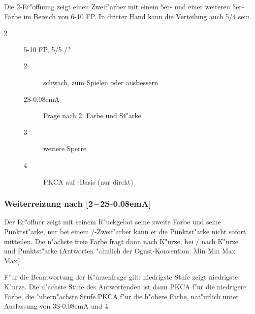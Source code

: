 \documentclass[11pt,german,twocolumn,twoside]{scrartcl}
\def\co{\He\xspace}
\def\tr{\Cl\xspace}
\def\sa{\nobreak\textsf{S\kern-0.08emA}\xspace}
\def\pik{\nobreak\hspace{\cardskip}\Sp\xspace}
\def\coe{\nobreak\hspace{\cardskip}\He\xspace}
\def\tre{\nobreak\hspace{\cardskip}\Cl\xspace}
\def\SA{\nobreak\hspace{\cardskip}\sa}
\def\sep{\,--\,}
\def\bdsc{\begin{description}}
\def\edsc{\end{description}}
\begin{document}
Die 2\coe-Er"offnung zeigt einen Zweif"arber mit einem 5er-\co und einer
weiteren 5er-Farbe im Bereich von 6-10 FP. In dritter Hand kann die Verteilung
auch 5/4 sein.

\bdsc
\item[2\coe] 5-10 FP, 5/5 \co/?
  \bdsc
  \item[2\pik] schwach, zum Spielen oder ausbessern
  \item[2\SA] Frage nach 2. Farbe und St"arke
  \item[3\coe] weitere Sperre
  \item[4\tre] PKCA auf \co-Basis (nur direkt)
  \edsc
\edsc

\subsubsection*{Weiterreizung nach [2\coe{}\sep2\SA{}]}

Der Er"offner zeigt mit seinem R"uckgebot seine zweite Farbe und seine
Punktst"arke, nur bei einem \co/\tr-Zweif"arber kann er die Punktst"arke nicht
sofort mitteilen. Die n"achste freie Farbe fragt dann nach K"urze, bei \co/\tr
nach K"urze und Punktst"arke (Antworten "ahnlich der Ogust-Konvention: Min Min
Max Max).

F"ur die Beantwortung der K"urzenfrage gilt: niedrigste Stufe zeigt niedrigste
K"urze. Die n"achste Stufe des Antwortenden ist dann PKCA f"ur die niedrigere
Farbe, die "ubern"achste Stufe PKCA f"ur die h"ohere Farbe, nat"urlich unter
Auslassung von 3\SA und 4\coe.
\end{document}

